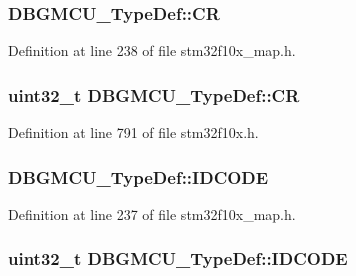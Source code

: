 \subsubsection[{\texorpdfstring{CR}{CR}}]{ D\+B\+G\+M\+C\+U\+\_\+\+Type\+Def\+::\+CR}\hypertarget{struct_d_b_g_m_c_u___type_def_af23701ed2c105fbafa2d8aa80c7106b7}{}\label{struct_d_b_g_m_c_u___type_def_af23701ed2c105fbafa2d8aa80c7106b7}


Definition at line 238 of file stm32f10x\+\_\+map.\+h.

\subsubsection[{\texorpdfstring{CR}{CR}}]{ {\bf uint32\+\_\+t} D\+B\+G\+M\+C\+U\+\_\+\+Type\+Def\+::\+CR}\hypertarget{struct_d_b_g_m_c_u___type_def_a15981828f2b915d38570cf6684e99a53}{}\label{struct_d_b_g_m_c_u___type_def_a15981828f2b915d38570cf6684e99a53}


Definition at line 791 of file stm32f10x.\+h.

\subsubsection[{\texorpdfstring{I\+D\+C\+O\+DE}{IDCODE}}]{ D\+B\+G\+M\+C\+U\+\_\+\+Type\+Def\+::\+I\+D\+C\+O\+DE}\hypertarget{struct_d_b_g_m_c_u___type_def_a1c549eb335812a48ba332c22d14ade1d}{}\label{struct_d_b_g_m_c_u___type_def_a1c549eb335812a48ba332c22d14ade1d}


Definition at line 237 of file stm32f10x\+\_\+map.\+h.

\subsubsection[{\texorpdfstring{I\+D\+C\+O\+DE}{IDCODE}}]{ {\bf uint32\+\_\+t} D\+B\+G\+M\+C\+U\+\_\+\+Type\+Def\+::\+I\+D\+C\+O\+DE}\hypertarget{struct_d_b_g_m_c_u___type_def_a0cc3561c124d06bb57dfa855e43ed99f}{}\label{struct_d_b_g_m_c_u___type_def_a0cc3561c124d06bb57dfa855e43ed99f}


